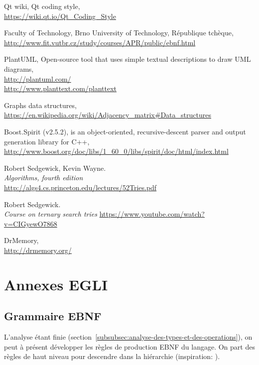 \documentclass[french]{article}
\begin{document}
	\listoffigures
			
	\begin{thebibliography}{9}
		Qt wiki, Qt coding style,\\ \url{https://wiki.qt.io/Qt_Coding_Style}
		
		Faculty of Technology, Brno University of Technology, République tchèque,\\ \url{http://www.fit.vutbr.cz/study/courses/APR/public/ebnf.html}
		
		PlantUML, Open-source tool that uses simple textual descriptions to draw UML diagrams,\\ \url{http://plantuml.com/}\\ \url{http://www.planttext.com/planttext}
		
		Graphs data structures,\\ \url{https://en.wikipedia.org/wiki/Adjacency_matrix#Data_structures}
		
		Boost.Spirit (v2.5.2), is an object-oriented, recursive-descent parser and output generation library for C++,\\ \url{http://www.boost.org/doc/libs/1_60_0/libs/spirit/doc/html/index.html}
		
		Robert Sedgewick, Kevin Wayne.\\
		\emph{Algorithms, fourth edition}\\
		\url{http://algs4.cs.princeton.edu/lectures/52Tries.pdf}
		
		Robert Sedgewick.\\
		\emph{Course on ternary search tries}
		\url{https://www.youtube.com/watch?v=CIGyewO7868}
		
		DrMemory,\\
		\url{http://drmemory.org/}
	\end{thebibliography}
			
	\newpage
	\section{Annexes EGLI}
	\label{sec:annexes-egli}
	
		\subsection{Grammaire EBNF} 
		L'analyse étant finie (section~\ref{subsubsec:analyse-des-types-et-des-operations}), on peut à présent développer les règles de production EBNF du langage. On part des règles de haut niveau pour descendre dans la hiérarchie (inspiration: \cite{vutbr.cz}).\\
		
\end{document}
